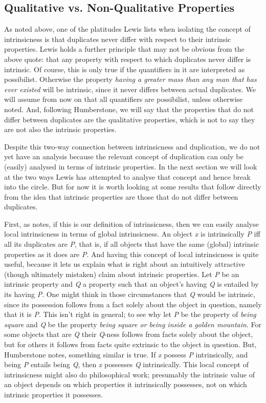 \subsection{Qualitative vs. Non-Qualitative Properties}
As noted above, one of the platitudes Lewis lists when isolating the concept of intrinsicness is that duplicates never differ with respect to their intrinsic properties. Lewis holds a further principle that may not be obvious from the above quote: that any property with respect to which duplicates never differ is intrinsic. Of course, this is only true if the quantifiers in it are interpreted as possibilist. Otherwise the property \textit{having a greater mass than any man that has ever existed} will be intrinsic, since it never differs between actual duplicates. We will assume from now on that all quantifiers are possibilist, unless otherwise noted. And, following Humberstone, we will say that the properties that do not differ between duplicates are the qualitative properties, which is not to say they are not also the intrinsic properties.

Despite this two-way connection between intrinsicness and duplication, we do not yet have an analysis because the relevant concept of duplication can only be (easily) analysed in terms of intrinsic properties. In the next section we will look at the two ways Lewis has attempted to analyse that concept and hence break into the circle. But for now it is worth looking at some results that follow directly from the idea that intrinsic properties are those that do not differ between duplicates.

First, as \cite[227]{Humberstone1996} notes, if this is our definition of intrinsicness, then we can easily analyse local intrinsicness in terms of global intrinsicness. An object \textit{x} is intrinsically \textit{P} iff all its duplicates are \textit{P}, that is, if all objects that have the same (global) intrinsic properties as it does are \textit{P}. And having this concept of local intrinsicness is quite useful, because it lets us explain what is right about an intuitively attractive (though ultimately mistaken) claim about intrinsic properties. Let \textit{P} be an intrinsic property and \textit{Q} a property such that an object's having \textit{Q} is entailed by its having \textit{P}. One might think in those circumstances that \textit{Q} would be intrinsic, since its possession follows from a fact solely about the object in question, namely that it is \textit{P}. This isn't right in general; to see why let \textit{P} be the property of \textit{being square} and \textit{Q} be the property \textit{being square or being inside a golden mountain}. For some objects that are \textit{Q} their \textit{Q}{}-ness follows from facts solely about the object, but for others it follows from facts quite extrinsic to the object in question. But, Humberstone notes, something similar is true. If \textit{x} possess \textit{P} intrinsically, and being \textit{P} entails being \textit{Q}, then \textit{x} possesses \textit{Q} intrinsically. This local concept of intrinsicness might also do philosophical work; presumably the intrinsic value of an object depends on which properties it intrinsically possesses, not on which intrinsic properties it possesses.


